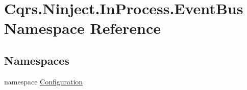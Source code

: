\hypertarget{namespaceCqrs_1_1Ninject_1_1InProcess_1_1EventBus}{}\section{Cqrs.\+Ninject.\+In\+Process.\+Event\+Bus Namespace Reference}
\label{namespaceCqrs_1_1Ninject_1_1InProcess_1_1EventBus}
\subsection*{Namespaces}
\begin{DoxyCompactItemize}
\item 
namespace \hyperlink{namespaceCqrs_1_1Ninject_1_1InProcess_1_1EventBus_1_1Configuration}{Configuration}
\end{DoxyCompactItemize}
